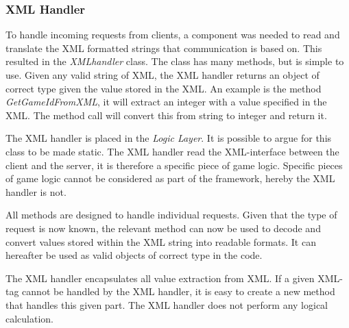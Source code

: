 \subsubsection{XML Handler}
\label{sec:xmlhandlerimpl}
To handle incoming requests from clients, a component was needed to read and translate the XML formatted strings that communication is based on. This resulted in the \textit{XMLhandler} class. The class has many methods, but is simple to use. Given any valid string of XML, the XML handler returns an object of correct type given the value stored in the XML. An example is the method \textit{GetGameIdFromXML}, it will extract an integer with a value specified in the XML. The method call will convert this from string to integer and return it. 

The XML handler is placed in the \textit{Logic Layer}. It is possible to argue for this class to be made static. The XML handler read the XML-interface between the client and the server, it is therefore a specific piece of game logic.  Specific pieces of game logic cannot be considered as part of the framework, hereby the XML handler is not.

All methods are designed to handle individual requests. Given that the type of request is now known, the relevant method can now be used to decode and convert values stored within the XML string into readable formats. It can hereafter be used as valid objects of correct type in the code.

The XML handler encapsulates all value extraction from XML. If a given XML-tag cannot be handled by the XML handler, it is easy to create a new method that handles this given part. The XML handler does not perform any logical calculation.